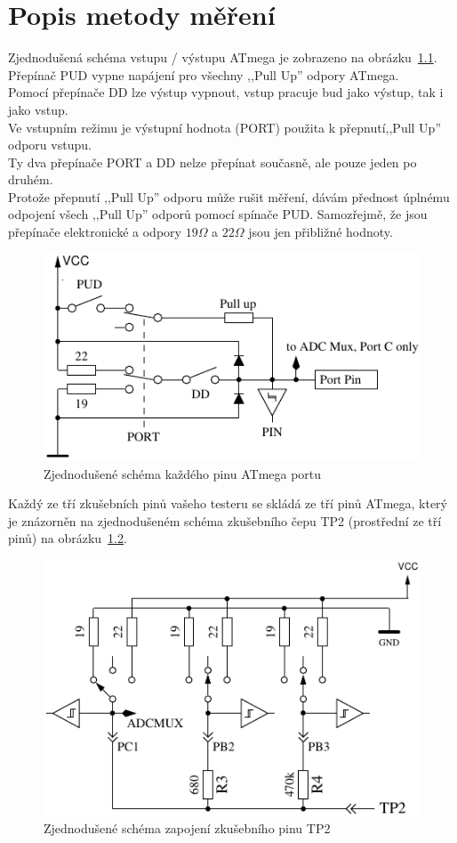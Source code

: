 \chapter{Popis metody měření}
\label{sec:measurement}
Zjednodušená schéma vstupu / výstupu ATmega je zobrazeno na obrázku~\ref{fig:port}.
Přepínač PUD vypne napájení pro všechny ,,Pull Up'' odpory ATmega.\\
Pomocí přepínače DD lze výstup vypnout, vstup pracuje bud jako výstup, tak i jako vstup.\\ Ve vstupním režimu je výstupní hodnota (PORT) použita k přepnutí,,Pull Up'' odporu vstupu.\\
Ty dva přepínače PORT a DD nelze přepínat současně, ale pouze jeden po druhém.\\
Protože přepnutí ,,Pull Up'' odporu může rušit měření, dávám přednost úplnému
odpojení všech  ,,Pull Up'' odporů pomocí spínače PUD.
Samozřejmě, že jsou přepínače elektronické a odpory \(19\Omega\) a \(22\Omega\) jsou jen přibližné hodnoty.\\

\begin{figure}[H]
\centering
\includegraphics[]{../FIG/port.pdf}
\caption{Zjednodušené schéma každého pinu ATmega portu}
\label{fig:port}
\end{figure}

Každý ze tří zkušebních pinů vašeho testeru se skládá ze tří pinů ATmega,
který je znázorněn na zjednodušeném schéma zkušebního čepu TP2 (prostřední ze tří pinů) na obrázku~\ref{fig:terminal}.

\begin{figure}[H]
\centering
\includegraphics[]{../FIG/terminal.pdf}
\caption{Zjednodušené schéma zapojení zkušebního pinu TP2}
\label{fig:terminal}
\end{figure}

